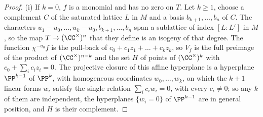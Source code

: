 \begin{proof}
(i) If $k=0$, $f$ is a monomial and has no zero on $T$. Let $k\ge1$, choose a
complement $C$ of the saturated lattice $L$ in $M$ and a basis
$b_{k+1},\dots,b_{n}$ of $C$. The characters $u_{1}-u_{0},\dots,u_{k}-u_{0},
b_{k+1},\dots,b_{n}$ span a sublattice of index $[L:L']$ in $M$, so the map
$T\to(\CC^{\times})^{n}$ that they define is an isogeny of that degree. The
function $\chi^{-u_{0}}f$ is the pull-back of $c_{0}+c_{1}z_{1}+\dots+c_{k}
z_{k}$, so $V_{f}$ is the full preimage of the product of
$(\CC^{\times})^{n-k}$ and the set $H$ of points of $(\CC^{\times})^{k}$ with
$c_{0}+\sum_{i}c_{i}z_{i}=0$. The projective closure of this affine hyperplane is a hyperplane
$\PP^{k-1}$ of $\PP^{k}$, with homogeneous coordinates $w_{0},\dots,w_{k}$,
on which the $k+1$ linear forms $w_{i}$ satisfy the single relation
$\sum_{i}c_{i}w_{i}=0$, with every $c_{i}\ne0$; so any $k$ of them are
independent, the hyperplanes $\{w_{i}=0\}$ of $\PP^{k-1}$ are in general
position, and $H$ is their complement.


\end{proof}
